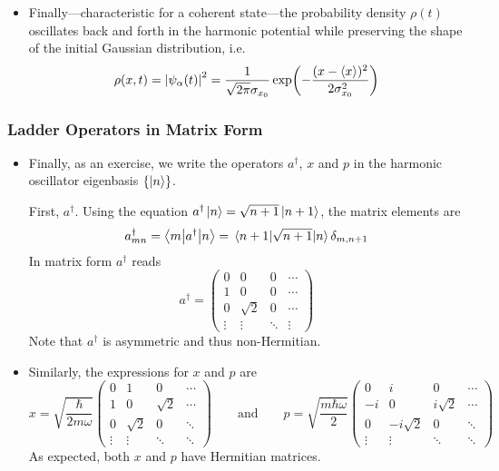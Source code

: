 \documentclass[11pt, a4paper]{article}
\newcommand{\eqtext}[1]{\qquad \text{#1} \qquad}
\newcommand{\Herm}{Hermitian\xspace}
\newcommand{\bmel}[3]{\big \langle {#1} \big | {#2} \big | {#3} \big \rangle}  %
\begin{document}
\begin{itemize}
	\item Finally---characteristic for a coherent state---the probability density $ \rho(t) $ oscillates back and forth in the harmonic potential while preserving the shape of the initial Gaussian distribution, i.e.
	\begin{equation*}
		\rho(x, t) = \abs{\psi_{\alpha}(t)}^{2} = \frac{1}{\sqrt{2\pi}\sigma_{x_{0}}}\exp(-\frac{(x - \ev{x})^{2}}{2 \sigma_{x_{0}}^{2}})
	\end{equation*}
	
\end{itemize}

\subsubsection{Ladder Operators in Matrix Form}
\begin{itemize}
	\item Finally, as an exercise, we write the operators $ a^{\dagger} $, $ x $ and $ p $ in the harmonic oscillator eigenbasis $ \{\ket{n} \} $. 
	
	First, $ a^{\dagger} $. Using the equation $ a^{\dagger}\ket{n} = \sqrt{n+1}\ket{n+1} $, the matrix elements are 
	\begin{equation*}
		a^{\dagger}_{mn} = \bmel{m}{a^{\dagger}}{n} = \mel{n+1}{\sqrt{n+1}}{n}\delta_{m, n+1}
	\end{equation*}
	In matrix form $ a^{\dagger} $ reads
	\begin{equation*}
	a^{\dagger} =
	\begin{pmatrix}
	0 & 0 & 0 & \cdots\\
	1 & 0 & 0 & \cdots\\
	0 & \sqrt{2} & 0 & \cdots\\
	\vdots & \vdots & \ddots & \vdots
	\end{pmatrix}
	\end{equation*}
	Note that $ a^{\dagger} $ is asymmetric and thus non-\Herm. 
	
	\item Similarly, the expressions for $ x $ and $ p $ are
	\begin{equation*}
		x = \sqrt{\frac{\hbar}{2m\omega}} 
		\begin{pmatrix}
		0 & 1 & 0 & \cdots\\
		1 & 0 & \sqrt{2} & \cdots\\
		0 & \sqrt{2} & 0 & \ddots\\
		\vdots & \vdots & \ddots & \ddots
		\end{pmatrix}
		\eqtext{and}
		p = \sqrt{\frac{m\hbar \omega}{2}} 
		\begin{pmatrix}
		0 & i & 0 & \cdots\\
		-i & 0 & i\sqrt{2} & \cdots\\
		0 & -i\sqrt{2} & 0 & \ddots\\
		\vdots & \vdots & \ddots & \ddots
		\end{pmatrix}
	\end{equation*}
	As expected, both $ x $ and $ p $ have \Herm matrices.
\end{itemize}
\end{document}

